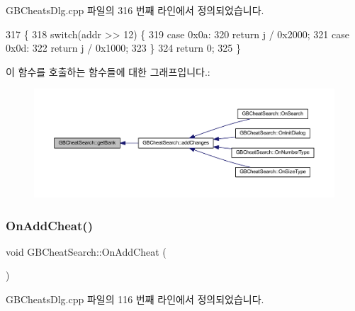 G\+B\+Cheats\+Dlg.\+cpp 파일의 316 번째 라인에서 정의되었습니다.


\begin{DoxyCode}
317 \{
318   \textcolor{keywordflow}{switch}(addr >> 12) \{
319   \textcolor{keywordflow}{case} 0x0a:
320     \textcolor{keywordflow}{return} j / 0x2000;
321   \textcolor{keywordflow}{case} 0x0d:
322     \textcolor{keywordflow}{return} j / 0x1000;
323   \}
324   \textcolor{keywordflow}{return} 0;
325 \}
\end{DoxyCode}
이 함수를 호출하는 함수들에 대한 그래프입니다.\+:
\nopagebreak
\begin{figure}[H]
\begin{center}
\leavevmode
\includegraphics[width=350pt]{class_g_b_cheat_search_aa5ca7951ce9dcc691eff7abb51cde184_icgraph}
\end{center}
\end{figure}
\mbox{\label{class_g_b_cheat_search_acd735709495f4e21e284a4442886152a}} 
\subsubsection{\texorpdfstring{On\+Add\+Cheat()}{OnAddCheat()}}
{\footnotesize\ttfamily void G\+B\+Cheat\+Search\+::\+On\+Add\+Cheat (\begin{DoxyParamCaption}{ }\end{DoxyParamCaption})\hspace{0.3cm}{\ttfamily [protected]}}



G\+B\+Cheats\+Dlg.\+cpp 파일의 116 번째 라인에서 정의되었습니다.


